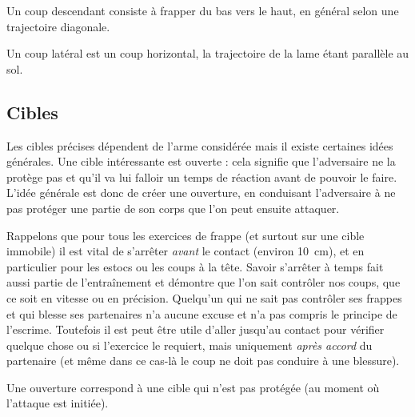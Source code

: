 \begin{coup}
\label{att:coup:montant}

Un coup descendant consiste à frapper du bas vers le haut, en général selon une trajectoire diagonale.

\end{coup}


\begin{coup}
\label{att:coup:latéral}

Un coup latéral est un coup horizontal, la trajectoire de la lame étant parallèle au sol.

\end{coup}


\subsection{Cibles}


Les cibles précises dépendent de l'arme considérée mais il existe certaines idées générales.
Une cible intéressante est ouverte : cela signifie que l'adversaire ne la protège pas et qu'il va lui falloir un temps de réaction avant de pouvoir le faire.
L'idée générale est donc de créer une ouverture, en conduisant l'adversaire à ne pas protéger une partie de son corps que l'on peut ensuite attaquer.

Rappelons que pour tous les exercices de frappe (et surtout sur une cible immobile) il est vital de s'arrêter \emph{avant} le contact (environ \SI{10}{cm}), et en particulier pour les estocs ou les coups à la tête.
Savoir s'arrêter à temps fait aussi partie de l'entraînement et démontre que l'on sait contrôler nos coups, que ce soit en vitesse ou en précision.
Quelqu'un qui ne sait pas contrôler ses frappes et qui blesse ses partenaires n'a aucune excuse et n'a pas compris le principe de l'escrime.
Toutefois il est peut être utile d'aller jusqu'au contact pour vérifier quelque chose ou si l'exercice le requiert, mais uniquement \emph{après accord} du partenaire (et même dans ce cas-là le coup ne doit pas conduire à une blessure).


\begin{definition}[Ouverture]

Une ouverture correspond à une cible qui n'est pas protégée (au moment où l'attaque est initiée).
\end{definition}


